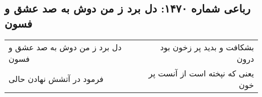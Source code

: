 \begin{center}
\section*{رباعی شماره ۱۴۷۰: دل برد ز من دوش به صد عشق و فسون}
\label{sec:1470}
\begin{longtable}{l p{0.5cm} r}
دل برد ز من دوش به صد عشق و فسون
&&
بشکافت و بدید پر زخون بود درون
\\
فرمود در آتشش نهادن حالی
&&
یعنی که نپخته است از آنست پر خون
\\
\end{longtable}
\end{center}
